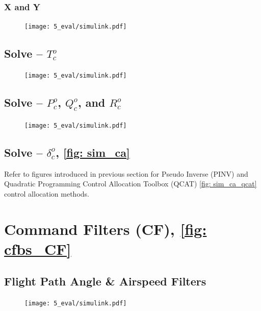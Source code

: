 \documentclass[12pt]{ucthesis}
\begin{document}
\subsubsection{X and Y} \label{subsubsec: app_CA_am_XY}
	\begin{figure}[H]
		\centering
		\texttt{[image: 5\_eval/simulink.pdf]}%
		\label{fig: cfbs_CA_am_XY}
	\end{figure}
\subsection{\texorpdfstring{Solve -- $T^o_c$}{Solve -- Thrust Command}}
\label{subsec: app_CA_t}
	\begin{figure}[H]
		\centering
		\texttt{[image: 5\_eval/simulink.pdf]}%
		\label{fig: cfbs_CA_t}
	\end{figure}
\subsection{\texorpdfstring{Solve -- $P^o_c$, $Q^o_c$, and $R^o_c$}{Solve -- Body Rate Commands}}
\label{subsec: app_CA_pqr}
	\begin{figure}[H]
		\begin{adjustwidth}{-1in}{-1in}%
			\centering
			\texttt{[image: 5\_eval/simulink.pdf]}%
		\end{adjustwidth}
		\label{fig: cfbs_CA_pqr}
	\end{figure}
\subsection{\texorpdfstring{Solve -- $\delta^o_c$, \autoref{fig: sim_ca}}{Solve -- Surface Commands, \autoref{fig: sim_ca}}}
\label{subsec: app_CA_d}
Refer to figures introduced in previous section for Pseudo Inverse (PINV)  and Quadratic Programming Control Allocation Toolbox (QCAT) \autoref{fig: sim_ca_qcat} control allocation methods.
\section{Command Filters (CF), \autoref{fig: cfbs_CF}}
\label{sec: app_CF}
\subsection{Flight Path Angle \& Airspeed Filters}
\label{subsec: app_CF_1}
	\begin{figure}[H]
		\begin{adjustwidth}{-1in}{-1in}
			\centering
			\texttt{[image: 5\_eval/simulink.pdf]}%
		\end{adjustwidth}
		\label{fig: cfbs_CF1}
	\end{figure}
\end{document}
